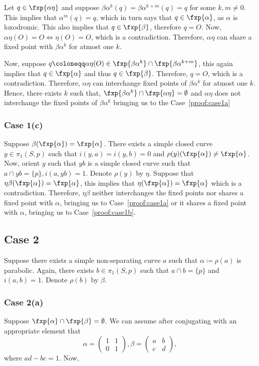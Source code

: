 Let $q \in \fxp{\alpha \eta}$ and suppose $\beta \alpha^k(q) = \beta \alpha^{k+m}(q) = q$ for some $k, m \neq 0$. This implies that $\alpha^m(q)=q$, which in turn says that $q \in \fxp{\alpha}$, as $\alpha$ is loxodromic. This also implies that $q \in \fxp{\beta}$, therefore $q = O$. Now, $\alpha \eta(O) = O \iff \eta(O) = O$, which is a contradiction. Therefore, $\alpha \eta$ can share a fixed point with $\beta \alpha^k$ for atmost one $k$.

Now, suppose $q \coloneqq \alpha \eta(O) \in \fxp{\beta \alpha^k} \cap \fxp{\beta \alpha^{k+m}}$, this again implies that $q \in \fxp{\alpha}$ and thus $q \in \fxp{\beta}$. Therefore, $q = O$, which is a contradiction. Therefore, $\alpha \eta$ can interchange fixed points of $\beta \alpha^k$ for atmost one $k$. Hence, there exists $k$ such that, $\fxp{\beta \alpha^k} \cap \fxp{\alpha \eta} = \emptyset$ and $\alpha \eta$ does not interchange the fixed points of $\beta \alpha^k$ bringing us to the Case~\ref{proof:case1a} 

\subsubsection{Case 1(c)} \label{proof:case1c} Suppose $\beta(\fxp{\alpha}) = \fxp{\alpha}$. There exists a simple closed curve $y \in \pi_1(S,p)$ such that $i(y,a) = i(y,b)=0$ and $\rho(y)(\fxp{\alpha}) \neq \fxp{\alpha}$. Now, orient $y$ such that $yb$ is a simple closed curve such that $a \cap yb = \{p\}, i(a, yb)= 1$. Denote $\rho(y)$ by $\eta$. Suppose that $\eta \beta(\fxp{\alpha}) = \fxp{\alpha}$, this implies that $\eta(\fxp{\alpha}) = \fxp{\alpha}$ which is a contradiction. Therefore, $\eta \beta$ neither interchanges the fixed points nor shares a fixed point with $\alpha$, bringing us to Case~\ref{proof:case1a} or it shares a fixed point with $\alpha$, bringing us to Case~\ref{proof:case1b}.

\subsection{Case 2}\label{proof:case2} Suppose there exists a simple non-separating curve $a$ such that $\alpha \coloneqq \rho(a)$ is parabolic. Again, there exists $b \in \pi_1(S,p)$ such that $a \cap b = \{p\}$ and $i(a,b) = 1$. Denote $\rho(b)$ by $\beta$.

\subsubsection{Case 2(a)}\label{proof:case2a} Suppose $\fxp{\alpha} \cap \fxp{\beta} = \emptyset$. We can assume after conjugating with an appropriate element that 
\[\alpha = \begin{pmatrix}
	1 & 1\\
	0 & 1
\end{pmatrix}, 
\beta = \begin{pmatrix}
	a & b\\
	c & d
\end{pmatrix},
\]
where $ad-bc=1$. Now,

